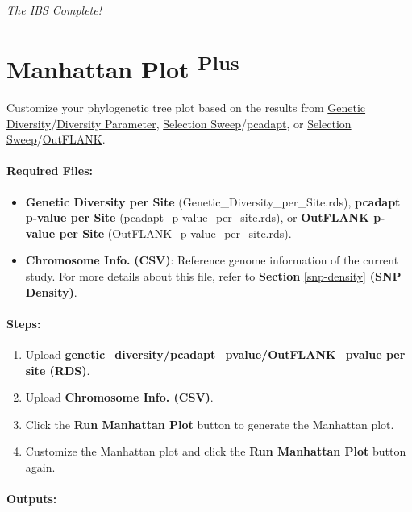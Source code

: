 \documentclass[
]{book}
\providecommand{\tightlist}{%
  \setlength{\itemsep}{0pt}\setlength{\parskip}{0pt}}
\begin{document}
\emph{The IBS Complete!}

\section{\texorpdfstring{Manhattan Plot \textsuperscript{Plus}}{Manhattan Plot Plus}}\label{manhattan-plot-plus}

Customize your phylogenetic tree plot based on the results from \ul{Genetic Diversity}/\ul{Diversity Parameter}, \ul{Selection Sweep}/\ul{pcadapt}, or \ul{Selection Sweep}/\ul{OutFLANK}.

\paragraph*{Required Files:}\label{required-files-2}

\begin{itemize}
\tightlist
\item
  \textbf{Genetic Diversity per Site} (Genetic\_Diversity\_per\_Site.rds), \textbf{pcadapt p-value per Site} (pcadapt\_p-value\_per\_site.rds), or \textbf{OutFLANK p-value per Site} (OutFLANK\_p-value\_per\_site.rds).
\item
  \textbf{Chromosome Info.} \textbf{(CSV)}: Reference genome information of the current study. For more details about this file, refer to \textbf{Section} \ref{snp-density} \textbf{(SNP Density)}.
\end{itemize}

\paragraph*{\texorpdfstring{\textbf{Steps:}}{Steps:}}\label{steps-10}

\begin{enumerate}
\def\labelenumi{\arabic{enumi}.}
\item
  {Upload} \textbf{genetic\_diversity/pcadapt\_pvalue/OutFLANK\_pvalue per site (RDS)}.
\item
  {Upload} \textbf{Chromosome Info. (CSV)}.
\item
  Click the {\textbf{Run Manhattan Plot}} button to generate the Manhattan plot.
\item
  Customize the Manhattan plot and click the {\textbf{Run Manhattan Plot}} button again.
\end{enumerate}

\paragraph*{Outputs:}\label{outputs-19}
\end{document}
